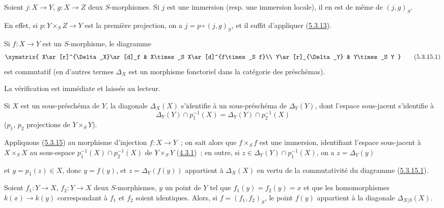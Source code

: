 \begin{corollary}[5.3.14]
\label{I.5.3.14-fr}
Soient $j:X\to Y$, $g:X\to Z$ deux $S$-morphismes. Si $j$ est une immersion
(resp. une immersion locale), il en est de même de $(j,g)_S$.
\end{corollary}

En effet, si $p:Y\times_S Z\to Y$ est la première projection, on a
$j=p\circ(j,g)_S$, et il suffit d'appliquer
(\hyperref[I.5.3.13-fr]{5.3.13}).

\begin{proposition}[5.3.15]
\label{I.5.3.15-fr}
Si $f:X\to Y$ est un $S$-morphisme, le diagramme
\[
  \xymatrix{
    X\ar[r]^{\Delta_X}\ar[d]_f &
    X\times_S X\ar[d]^{f\times_S f}\\
    Y\ar[r]_{\Delta_Y} &
    Y\times_S Y
  }
  \tag{5.3.15.1}\label{I.5.3.15.1-fr}
\]
est commutatif (en d'autres termes $\Delta_X$ est un morphisme fonctoriel
dans la catégorie des préschémas).
\end{proposition}

La vérification est immédiate et laissée au lecteur.

\begin{corollary}[5.3.16]
\label{I.5.3.16-fr}
Si $X$ est un sous-préschéma de $Y$, la diagonale $\Delta_X(X)$ s'identifie à
un sous-préschéma de $\Delta_Y(Y)$, dont l'espace sous-jacent s'identifie à
\[
  \Delta_Y(Y)\cap p_1^{-1}(X)=\Delta_Y(Y)\cap p_2^{-1}(X)
\]
($p_1$, $p_2$ projections de $Y\times_S Y$).
\end{corollary}

Appliquons (\hyperref[I.5.3.15-fr]{5.3.15}) au morphisme d'injection
$f:X\to Y$~; on sait alors que $f\times_S f$ est une immersion, identifiant
l'espace sous-jacent à $X\times_S X$ au sous-espace
$p_1^{-1}(X)\cap p_2^{-1}(X)$ de $Y\times_S Y$
(\hyperref[I.4.3.1-fr]{4.3.1})~; en outre, si
$z\in\Delta_Y(Y)\cap p_1^{-1}(X)$, on a $z=\Delta_Y(y)$

et $y=p_1(z)\in X$, donc $y=f(y)$, et $z=\Delta_Y(f(y))$ appartient à
$\Delta_X(X)$ en vertu de la commutativité du diagramme
(\hyperref[I.5.3.15.1-fr]{5.3.15.1}).

\begin{corollary}[5.3.17]
\label{I.5.3.17-fr}
Soient $f_1:Y\to X$, $f_2:Y\to X$ deux $S$-morphismes, $y$ un point de $Y$
tel que $f_1(y)=f_2(y)=x$ et que les homomorphismes $k(x)\to k(y)$
correspondant à $f_1$ et $f_2$ soient identiques. Alors, si
$f=(f_1,f_2)_S$, le point $f(y)$ appartient à la diagonale
$\Delta_{X|S}(X)$.
\end{corollary}


